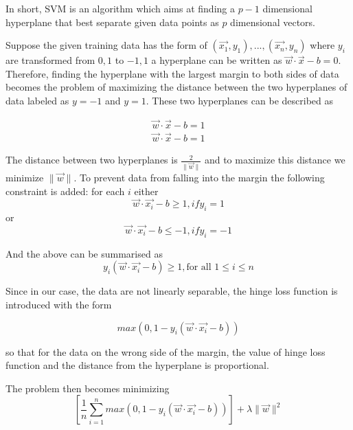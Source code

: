 \documentclass{kththesis}
\begin{document}
In short, SVM is an algorithm which aims at finding a $p-1$ dimensional hyperplane that best separate given data points as $p$ dimensional vectors.

Suppose the given training data has the form of $(\vec{x_{1}}, y_{1}), ... ,(\vec{x_{n}},y_{n})$ where $y_{i}$ are transformed from ${0,1}$ to ${-1,1}$ a hyperplane can be written as $\vec{w} \cdot \vec{x} -b=0$. Therefore, finding the hyperplane with the largest margin to both sides of data becomes the problem of maximizing the distance between the two hyperplanes of data labeled as $y=-1$ and $y=1$. These two hyperplanes can be described as

\begin{align}
\vec{w} \cdot \vec{x} -b=1 \\
\vec{w} \cdot \vec{x} -b=1
\end{align}

The distance between two hyperplanes is $\frac{2}{\parallel \vec{w} \parallel}$ and to maximize this distance we minimize $\parallel\vec{w}\parallel$. To prevent data from falling into the margin the following constraint is added: for each $i$ either 
\begin{equation}
\vec{w} \cdot \vec{x_{i}} - b \geq 1, if y_{i} = 1
\end{equation}
or
\begin{equation}
\vec{w} \cdot \vec{x_{i}} - b \leq -1, if y_{i} = -1
\end{equation}

And the above can be summarised as
\begin{equation}
y_{i}(\vec{w} \cdot \vec{x_{i}}-b) \geq 1, \text{for all } 1\leq i \leq n
\end{equation}

Since in our case, the data are not linearly separable, the hinge loss function is introduced with the form

\begin{equation}
max(0,1-y_{i}(\vec{w} \cdot \vec{x_{i}}-b))
\end{equation}

so that for the data on the wrong side of the margin, the value of hinge loss function and the distance from the hyperplane is proportional.

The problem then becomes minimizing
\begin{equation}
\left[\frac{1}{n} \sum^{n}_{i=1}max(0,1-y_{i}(\vec{w} \cdot \vec{x_{i}}-b))\right] + \lambda \parallel \vec{w} \parallel^{2}
\end{equation}
\end{document}
